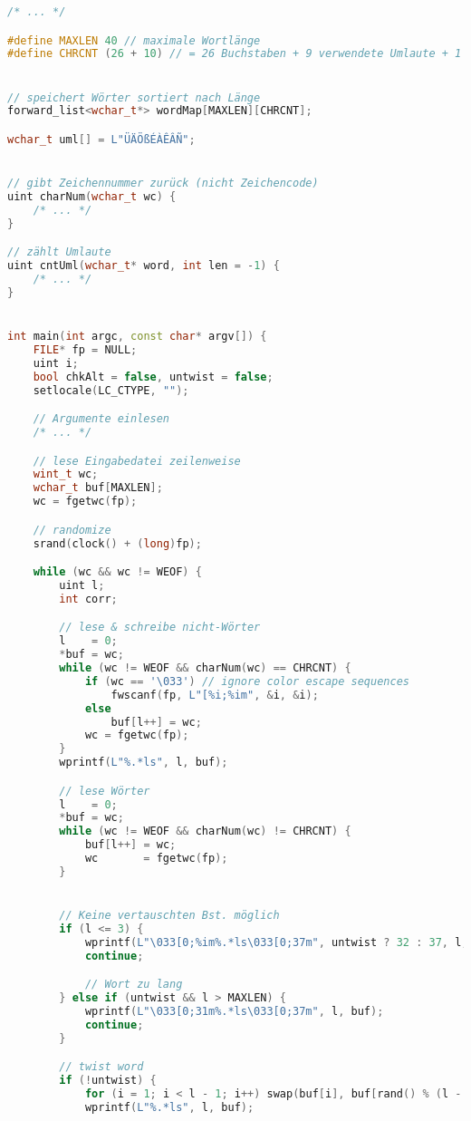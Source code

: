 \documentclass[a4paper,10pt,ngerman]{scrartcl}
\begin{document}
\begin{lstlisting}[language=C++]
/* ... */

#define MAXLEN 40 // maximale Wortlänge
#define CHRCNT (26 + 10) // = 26 Buchstaben + 9 verwendete Umlaute + 1 für andere Sonderzeichen/Umlaute


// speichert Wörter sortiert nach Länge
forward_list<wchar_t*> wordMap[MAXLEN][CHRCNT];

wchar_t uml[] = L"ÜÄÖßÉÀÊÂÑ";


// gibt Zeichennummer zurück (nicht Zeichencode)
uint charNum(wchar_t wc) {
    /* ... */
}

// zählt Umlaute
uint cntUml(wchar_t* word, int len = -1) {
    /* ... */
}


int main(int argc, const char* argv[]) {
    FILE* fp = NULL;
    uint i;
    bool chkAlt = false, untwist = false;
    setlocale(LC_CTYPE, "");

    // Argumente einlesen
    /* ... */

    // lese Eingabedatei zeilenweise
    wint_t wc;
    wchar_t buf[MAXLEN];
    wc = fgetwc(fp);

    // randomize
    srand(clock() + (long)fp);

    while (wc && wc != WEOF) {
        uint l;
        int corr;

        // lese & schreibe nicht-Wörter
        l    = 0;
        *buf = wc;
        while (wc != WEOF && charNum(wc) == CHRCNT) {
            if (wc == '\033') // ignore color escape sequences
                fwscanf(fp, L"[%i;%im", &i, &i);
            else
                buf[l++] = wc;
            wc = fgetwc(fp);
        }
        wprintf(L"%.*ls", l, buf);

        // lese Wörter
        l    = 0;
        *buf = wc;
        while (wc != WEOF && charNum(wc) != CHRCNT) {
            buf[l++] = wc;
            wc       = fgetwc(fp);
        }


        // Keine vertauschten Bst. möglich
        if (l <= 3) {
            wprintf(L"\033[0;%im%.*ls\033[0;37m", untwist ? 32 : 37, l, buf);
            continue;

            // Wort zu lang
        } else if (untwist && l > MAXLEN) {
            wprintf(L"\033[0;31m%.*ls\033[0;37m", l, buf);
            continue;
        }

        // twist word
        if (!untwist) {
            for (i = 1; i < l - 1; i++) swap(buf[i], buf[rand() % (l - 2) + 1]);
            wprintf(L"%.*ls", l, buf);


\end{lstlisting}
\end{document}
